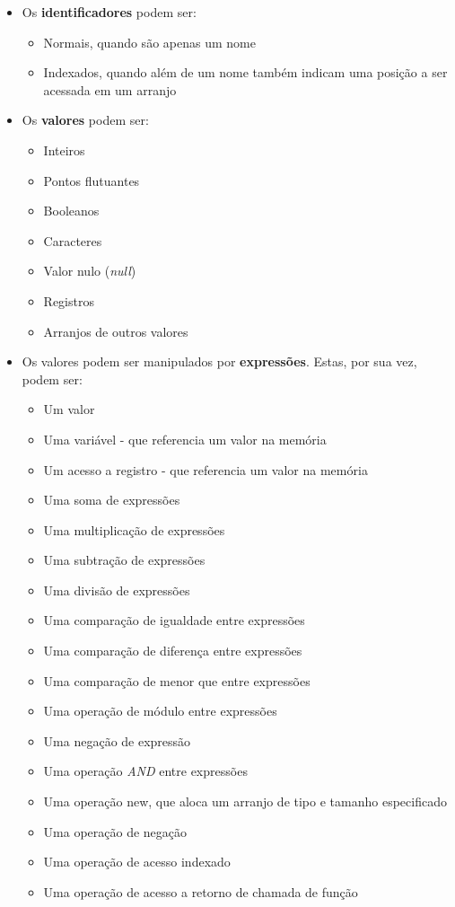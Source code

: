 \documentclass{article}
\begin{document}
\begin{itemize}
    \item Os \textbf{identificadores} podem ser:
    \begin{itemize}
        \item Normais, quando são apenas um nome
        \item Indexados, quando além de um nome também indicam uma posição a ser acessada em um arranjo
    \end{itemize}
    
    \item Os \textbf{valores} podem ser:
    \begin{itemize}
        \item Inteiros
        \item Pontos flutuantes
        \item Booleanos
        \item Caracteres
        \item Valor nulo (\textit{null})
        \item Registros
        \item Arranjos de outros valores
    \end{itemize}
    
    \item Os valores podem ser manipulados por \textbf{expressões}. Estas, por sua vez, podem ser:
    \begin{itemize}
        \item Um valor
        \item Uma variável - que referencia um valor na memória
        \item Um acesso a registro - que referencia um valor na memória
        \item Uma soma de expressões
        \item Uma multiplicação de expressões
        \item Uma subtração de expressões
        \item Uma divisão de expressões
        \item Uma comparação de igualdade entre expressões
        \item Uma comparação de diferença entre expressões
        \item Uma comparação de menor que entre expressões
        \item Uma operação de módulo entre expressões
        \item Uma negação de expressão
        \item Uma operação \textit{AND} entre expressões
        \item Uma operação new, que aloca um arranjo de tipo e tamanho especificado
        \item Uma operação de negação
        \item Uma operação de acesso indexado
        \item Uma operação de acesso a retorno de chamada de função
        

\end{itemize}
\end{itemize}
\end{document}
